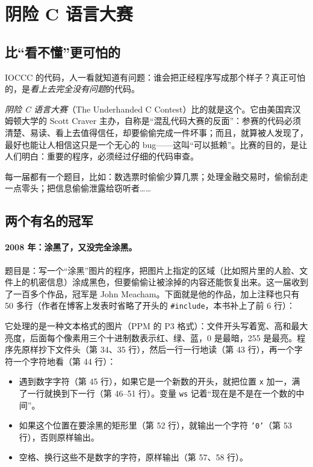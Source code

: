 \section{阴险 C 语言大赛}

\subsection{比“看不懂”更可怕的}

IOCCC 的代码，人一看就知道有问题：谁会把正经程序写成那个样子？真正可怕的，是\emph{看上去完全没有问题}的代码。

\emph{阴险 C 语言大赛}（The Underhanded C Contest）比的就是这个。它由美国宾汉姆顿大学的 Scott Craver 主办，自称是“混乱代码大赛的反面”：参赛的代码必须清楚、易读、看上去值得信任，却要偷偷完成一件坏事；而且，就算被人发现了，最好也能让人相信这只是一个无心的 bug——这叫“可以抵赖”。比赛的目的，是让人们明白：重要的程序，必须经过仔细的代码审查。

每一届都有一个题目，比如：数选票时偷偷少算几票；处理金融交易时，偷偷刮走一点零头；把信息偷偷泄露给窃听者……

\subsection{两个有名的冠军}

\paragraph{2008 年：涂黑了，又没完全涂黑。}
题目是：写一个“涂黑”图片的程序，把图片上指定的区域（比如照片里的人脸、文件上的机密信息）涂成黑色，但要偷偷让被涂掉的内容还能恢复出来。这一届收到了一百多个作品，冠军是 John Meacham。下面就是他的作品，加上注释也只有 50 多行（作者在博客上发表时省略了开头的 \texttt{\#include}，本书补上了前 6 行）：


它处理的是一种文本格式的图片（PPM 的 P3 格式）：文件开头写着宽、高和最大亮度，后面每个像素用三个十进制数表示红、绿、蓝，0 是最暗，255 是最亮。程序先原样抄下文件头（第 34、35 行），然后一行一行地读（第 43 行），再一个字符一个字符地看（第 44 行）：
\begin{itemize}
  \item 遇到数字字符（第 45 行），如果它是一个新数的开头，就把位置 \texttt{x} 加一，满了一行就换到下一行（第 46--51 行）。变量 \texttt{ws} 记着“现在是不是在一个数的中间”。
  \item 如果这个位置在要涂黑的矩形里（第 52 行），就输出一个字符 \texttt{'0'}（第 53 行），否则原样输出。
  \item 空格、换行这些不是数字的字符，原样输出（第 57、58 行）。
\end{itemize}


